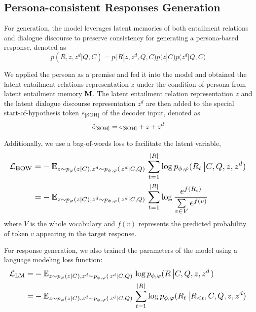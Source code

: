 \documentclass[letterpaper]{article} \usepackage{aaai23}  \usepackage{times}  \usepackage{helvet}  \usepackage{courier}  \usepackage[hyphens]{url}  \usepackage{graphicx} \urlstyle{rm} \def\UrlFont{\rm}  \usepackage{natbib}  \usepackage{caption} \frenchspacing  \setlength{\pdfpagewidth}{8.5in}  \setlength{\pdfpageheight}{11in}  \usepackage{algorithm}
\begin{document}
\subsection{Persona-consistent Responses Generation}
For generation, the model leverages latent memories of both entailment relations and dialogue discourse to preserve consistency for generating a persona-based response, denoted as
\begin{equation}
p\left( {R,z,{z^d}\left| {Q,C} \right.} \right) = p(R\left| {z,{z^d},Q,C)p(z\left| {C)p({z^d}\left| {Q,C)} \right.} \right.} \right.
\label{eq13}
\end{equation}

We applied the persona as a premise and fed it into the model and obtained the latent entailment relations representation $z$ under the condition of persona from latent entailment memory ${\bf{M}}$. The latent entailment relation representation $z$ and the latent dialogue discourse representation ${z^d}$ are then added to the special start-of-hypothesis token ${e_{{\rm{[SOH]}}}}$ of the decoder input, denoted as
\begin{equation}
{\hat e_{{\rm{[SOH]}}}} = {e_{{\rm{[SOH]}}}} + z + {z^d}
\label{eq14}
\end{equation}

Additionally, we use a bag-of-words loss \cite{Zhao2017} to facilitate the latent variable,
\begin{equation}
\resizebox{1\hsize}{!}{$
\begin{aligned}
{\mathcal{L}_{{\text{BOW}}}} = &- {\mathbb{E}_{z \sim {p_\varphi }(z\left| {C),{z^d} \sim {p_{\phi ,\varphi }}(} \right.{z^d}\left| {C,Q)} \right.}} \sum\limits_{t = 1}^{\left| R \right|} {\log {p_{\phi ,\varphi }}} ({R_t}\left| {C,Q,z,{z^d})} \right. \\ 
   = &  - {\mathbb{E}_{z \sim {p_\varphi }(z\left| {C),{z^d} \sim {p_{\phi ,\varphi }}(} \right.{z^d}\left| {C,Q)} \right.}}\sum\limits_{t = 1}^{\left| R \right|} {\log \frac{{{e^{f({R_t})}}}}{{\sum\limits_{v \in V} {{e^{f\left( v \right)}}} }}} \\ 
\end{aligned}
$}
\label{eq15}
\end{equation}
where $V$ is the whole vocabulary and $f\left( v \right)$ represents the predicted probability of token $v$  appearing in the target response.

For response generation, we also trained the parameters of the model using a language modeling loss function:
\begin{equation}
\resizebox{1\hsize}{!}{$
\begin{aligned}
  {\mathcal{L}_{{\text{LM}}}} = & - {\mathbb{E}_{z \sim {p_\varphi }(z\left| {C),{z^d} \sim {p_{\phi ,\varphi }}(} \right.{z^d}\left| {C,Q)} \right.}}\log {p_{\phi ,\varphi }}(R\left| {C,Q,z,{z^d}} \right.) \\ 
 = & - {\mathbb{E}_{z \sim {p_\varphi }(z\left| {C),{z^d} \sim {p_{\phi ,\varphi }}(} \right.{z^d}\left| {C,Q)} \right.}}\sum\limits_{t = 1}^{\left| R \right|} {\log {p_{\phi ,\varphi }}({R_t}\left| {{R_{ < t}},C,Q,z,{z^d}})\right.}  \\ 
\end{aligned}
$}
\label{eq16}
\end{equation}
\end{document}
